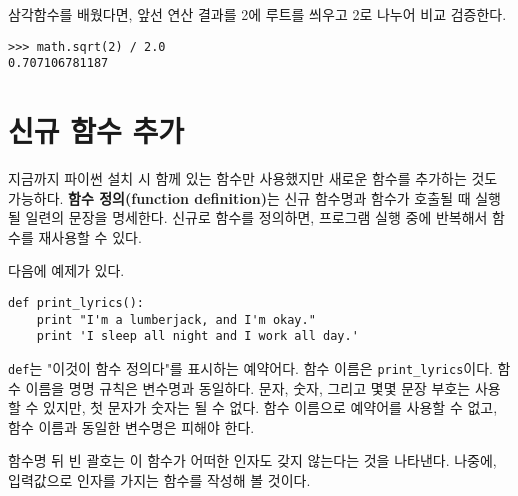 
삼각함수를 배웠다면, 앞선 연산 결과를 2에 루트를 씌우고 2로 나누어 비교 검증한다.


\beforeverb
\begin{verbatim}
>>> math.sqrt(2) / 2.0
0.707106781187
\end{verbatim}
\afterverb
%

\section{신규 함수 추가}

지금까지 파이썬 설치 시 함께 있는 함수만 사용했지만 새로운 함수를 추가하는 것도 가능하다.
{\bf 함수 정의(function definition)}는 신규 함수명과 함수가 호출될 때 실행될 일련의 문장을 명세한다.
신규로 함수를 정의하면, 프로그램 실행 중에 반복해서 함수를 재사용할 수 있다. 


다음에 예제가 있다.

\beforeverb
\begin{verbatim}
def print_lyrics():
    print "I'm a lumberjack, and I'm okay."
    print 'I sleep all night and I work all day.'
\end{verbatim}
\afterverb
%

{\tt def}는 "이것이 함수 정의다"를 표시하는 예약어다. 
함수 이름은 \verb"print_lyrics"이다.
함수 이름을 명명 규칙은 변수명과 동일하다. 
문자, 숫자, 그리고 몇몇 문장 부호는 사용할 수 있지만, 첫 문자가 숫자는 될 수 없다. 
함수 이름으로 예약어를 사용할 수 없고, 함수 이름과 동일한 변수명은 피해야 한다.


함수명 뒤 빈 괄호는 이 함수가 어떠한 인자도 갖지 않는다는 것을 나타낸다.
나중에, 입력값으로 인자를 가지는 함수를 작성해 볼 것이다.


